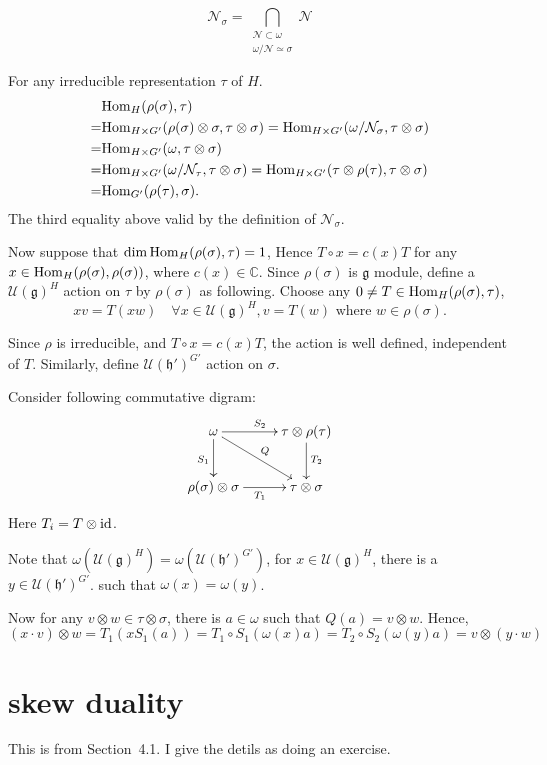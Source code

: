 \documentclass[12pt]{article}
\def\Hom{{\rm Hom}}
\def\bC{{\mathbb{C}}}
\def\id{{\rm id}}
\def\fhh{\mathfrak{h}}
\def\fgg{\mathfrak{g}}
\def\cnn{\mathcal{N}}
\def\cuu{\mathcal{U}}
\begin{document}
\[
\cnn_\sigma = \bigcap_{\substack{\cnn\subset \omega\\ \omega/\cnn\simeq \sigma}}\cnn
\]

For any irreducible representation $\tau$ of $H$.
\[
\begin{split}
&\Hom_{H}(\rho(\sigma), \tau)\\
= & \Hom_{H\times G'}(\rho(\sigma)\otimes \sigma, \tau\otimes \sigma)
=  \Hom_{H\times G'}(\omega/\cnn_\sigma, \tau\otimes \sigma)\\
= & \Hom_{H\times G'}(\omega, \tau\otimes \sigma)\\
= & \Hom_{H\times G'}(\omega/\cnn_\tau, \tau\otimes \sigma)
= \Hom_{H\times G'}(\tau\otimes \rho(\tau), \tau\otimes \sigma)\\
= & \Hom_{G'}(\rho(\tau), \sigma).
\end{split}
\]
The third equality above valid by the definition of $\cnn_\sigma$. 


Now suppose that $\dim \Hom_{H}(\rho(\sigma),\tau)=1$,
Hence $T\circ x = c(x) T$ for any $x\in \Hom_{H}(\rho(\sigma),\rho(\sigma))$, where $c(x)\in \bC$.
Since $\rho(\sigma)$ is $\fgg$ module, define a $\cuu(\fgg)^H$ action 
on $\tau$ by $\rho(\sigma)$ as following.
Choose any $0 \neq T\in \Hom_{H}(\rho(\sigma),\tau)$,
\[
x v = T(x w) \quad  \forall x\in \cuu(\fgg)^H, v=T(w) 
\text{ where } w\in \rho(\sigma).
\] 

Since $\rho$ is irreducible, and $T\circ x = c(x) T$, 
the action is well defined, independent of $T$. 
Similarly, define $\cuu(\fhh')^{G'}$ action on $\sigma$.

Consider following commutative digram:
\[
\xymatrix{
\omega \ar[r]^{S_2} \ar[d]_{S_1}\ar[dr]^{Q} & \tau\otimes \rho(\tau)\ar[d]^{T_2}\\
\rho(\sigma)\otimes \sigma\ar[r]_{T_1} & \tau\otimes \sigma 
}
\]
Here $T_i = T\otimes \id$.

Note that $\omega(\cuu(\fgg)^H) = \omega(\cuu(\fhh')^{G'})$,
for $x\in \cuu(\fgg)^H$, 
there is a $y\in \cuu(\fhh')^{G'}$.
such that $\omega(x) = \omega(y)$.


Now for any $v\otimes w\in \tau\otimes \sigma$, there is $a\in \omega$ such
that $Q(a) = v\otimes w$.
Hence, 
\[
(x \cdot v)\otimes w 
= T_1 (x S_1 (a))
= T_1 \circ S_1 (\omega(x) a)
= T_2 \circ S_2 (\omega(y) a)
= v\otimes (y\cdot w) 
\]

\section{skew duality}
This is from \cite{Howe1995perspective} Section~4.1. 
I give the detils as doing an  exercise.
\end{document}
